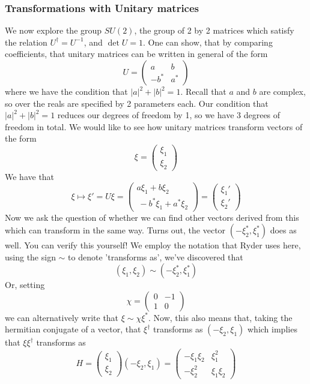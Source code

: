 \subsubsection{Transformations with Unitary matrices} 
We now explore the group $SU(2)$, the group of 2 by 2 matrices which satisfy the relation $U^\dagger = U^ { -1} $, and $\det U = 1$. One can show, that by comparing coefficients, that unitary matrices can be written in general of the form 
\[ 
U = \begin{pmatrix} a & b \\  -b^* & a^* \end{pmatrix} 
\] 
where we have the condition that $|a|^2 + |b|^2 = 1 $. Recall that $a$ and $b$ are complex, so over the reals are specified by 2 parameters each. Our condition that $|a|^2 + |b|^2 = 1$ reduces our degrees of freedom by 1, so we have 3 degrees of freedom in total.  
We would like to see how unitary matrices transform vectors of the form \[ \xi = \begin{pmatrix} \xi_1 \\ \xi_2 \end{pmatrix} \]
We have that \[ \xi \mapsto \xi' = U \xi = \begin{pmatrix} 
a \xi_1 + b \xi_2 \\ \ - b^* \xi_1 + a^* \xi_2 \end{pmatrix} = \begin{pmatrix} \xi_1' \\ \xi_2' \end{pmatrix}  \]
Now we ask the question of whether we can find other vectors derived from this which can transform in the same way. Turns out, the vector $( - \xi_2^*, \xi_1^* ) $ does as well. You can verify this yourself! We employ the notation that Ryder uses here, using the sign $\sim $ to denote 'transforms as', we've discovered that \[ (\xi_1, \xi_2) \sim (  -\xi_2^*, \xi_1^* ) \] 
Or, setting \[ \chi = \begin{pmatrix} 0 & -1 \\  1 & 0 \end{pmatrix} \] we can alternatively write that $ \xi \sim \chi \xi^* $. Now, this also means that, taking the hermitian conjugate of a vector, that $\xi^\dagger $ transforms as $ ( - \xi_2 , \xi_1 ) $ 
which implies that $\xi \xi^\dagger$ transforms as \[ 
H = \begin{pmatrix} \xi_1 \\ \xi_2 \end{pmatrix} ( -\xi_2, \xi_1) = 
\begin{pmatrix}  - \xi_1 \xi_2 & \xi_1^2 \\  - \xi_2^2 & \xi_1 \xi_2 \end{pmatrix} \] 
